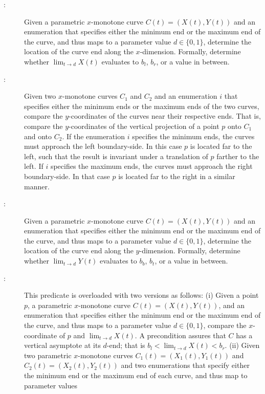 \begin{description}
\item[:]
  Given a parametric $x$-monotone curve $C(t) = (X(t),Y(t))$ and an
  enumeration that specifies either the minimum end or the maximum end
  of the curve, and thus maps to a parameter value $d \in \{0,1\}$,
  determine the location of the curve end along the $x$-dimension.
  Formally, determine whether $\lim_{t \rightarrow d} X(t)$ evaluates
  to $b_l$, $b_r$, or a value in between.
\item[:]
  Given two $x$-monotone curves $C_1$ and $C_2$ and an enumeration $i$
  that specifies either the minimum ends or the maximum ends of the
  two curves, compare the $y$-coordinates of the curves near their
  respective ends. That is, compare the $y$-coordinates of the
  vertical projection of a point $p$ onto $C_1$ and onto $C_2$. If the
  enumeration $i$ specifies the minimum ends, the curves must approach
  the left boundary-side. In this case $p$ is located far to the left,
  such that the result is invariant under a translation of $p$ farther
  to the left. If $i$ specifies the maximum ends, the curves must
  approach the right boundary-side. In that case $p$ is located far to
  the right in a similar manner.
\item[:]
  Given a parametric $x$-monotone curve $C(t) = (X(t),Y(t))$ and an
  enumeration that specifies either the minimum end or the maximum end
  of the curve, and thus maps to a parameter value $d \in \{0,1\}$,
  determine the location of the curve end along the $y$-dimension.
  Formally, determine whether $\lim_{t \rightarrow d} Y(t)$ evaluates
  to $b_b$, $b_t$, or a value in between.
\item[:]
  This predicate is overloaded with two versions as follows:
  (i) Given a point $p$, a parametric $x$-monotone curve
    $C(t) = (X(t),Y(t))$, and an enumeration that specifies either the
    minimum end or the maximum end of the curve, and thus maps to a
    parameter value $d \in \{0,1\}$, compare the $x$-coordinate of $p$
    and $\lim_{t \rightarrow d} X(t)$. A precondition assures that $C$
    has a vertical asymptote at its $d$-end; that is
    $b_l < \lim_{t \rightarrow d} X(t) < b_r$.
  (ii) Given two parametric $x$-monotone curves
    $C_1(t) = (X_1(t),Y_1(t))$ and $C_2(t) = (X_2(t),Y_2(t))$ and two
    enumerations that specify either the minimum end or the maximum
    end of each curve, and thus map to parameter values

\end{description}
